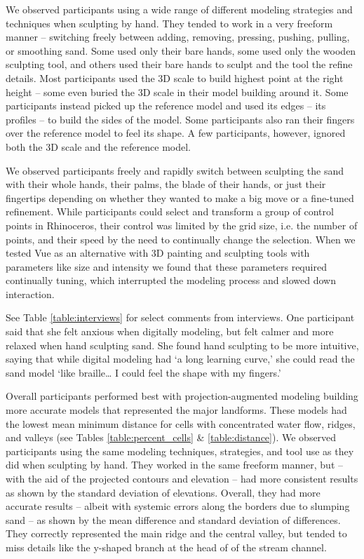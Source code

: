 \documentclass[prodmode,acmtochi]{acmsmall} %
\begin{document}
We observed participants using 
a wide range of different modeling strategies
and techniques when sculpting by hand. 
They tended to work in a very freeform manner 
-- switching freely between
adding, removing, pressing, pushing, pulling, or smoothing
sand. 
Some used only their bare hands, 
some used only the wooden sculpting tool,
and others used their bare hands to sculpt 
and the tool the refine details. 
Most participants used the 3D scale
to build highest point at the right height
-- some even buried the 3D scale in their model
building around it. 
%
Some participants instead 
picked up the reference model
and used its edges -- its profiles -- to build 
the sides of the model. 
Some participants also ran their fingers 
over the reference model to feel its shape.
A few  participants, however,
ignored both the 3D scale
and the reference model. 

We observed participants 
freely and rapidly switch between 
sculpting the sand with 
their whole hands,
their palms,
the blade of their hands, 
or just their fingertips 
depending on whether 
they wanted to make a big move
or a fine-tuned refinement.
%
While participants could select and transform
a group of control points in Rhinoceros,
their control was limited by the grid size, i.e. the number of points,
and their speed by the need to continually change the selection.
%
When we tested Vue as an alternative
with 3D painting and sculpting tools
with parameters like size and intensity
we found that these parameters 
required continually tuning,
which interrupted the modeling process 
and slowed down interaction.

See Table \ref{table:interviews} for select comments from interviews.
One participant said that she felt anxious when digitally modeling,
but felt calmer and more relaxed when hand sculpting sand. 
She found hand sculpting to be more intuitive, saying that
while digital modeling had `a long learning curve,' 
she could read the sand model `like braille\ldots 
I could feel the shape with my fingers.'

Overall participants performed best
with projection-augmented modeling
building more accurate models 
that represented the major landforms.
%
These models had the lowest mean minimum distance 
for cells with concentrated water flow, ridges, and valleys
(see Tables \ref{table:percent_cells} \& \ref{table:distance}). 
%
We observed participants using the same
modeling techniques, strategies, and tool use
as they did when sculpting by hand. 
They worked in the same freeform manner, but 
-- with the aid of the projected contours and elevation --
had more consistent results 
as shown by the standard deviation of elevations.
%
Overall, they had more accurate results
-- albeit with systemic errors along the borders 
due to slumping sand --
as shown by the mean difference and
standard deviation of differences. 
%
They correctly represented the main ridge and 
the central valley, but tended to miss details
like the y-shaped branch at the head of
of the stream channel. 
\end{document}

